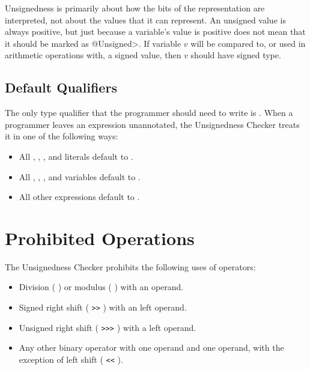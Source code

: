 Unsignedness is primarily about how the bits of the representation are
interpreted, not about the values that it can represent.  An unsigned value
is always positive, but just because a variable's value is positive does
not mean that it should be marked as \<@Unsigned>.  If variable $v$ will be
compared to, or used in arithmetic operations with, a signed value, then
$v$ should have signed type.


\subsection{Default Qualifiers\label{unsignedness-checker-annotations-default-qualifiers}}

The only type qualifier that the programmer should need to write is
. When a programmer leaves an expression unannotated, the
Unsignedness Checker treats it in one of the following ways:

\begin{itemize}

    \item
    All , , , and  literals default
    to .
    \item
    All , , , and  variables default
    to .
    \item
    All other expressions default to .

\end{itemize}

\section{Prohibited Operations\label{unsignedness-checker-Prohibited-Operations}}

The Unsignedness Checker prohibits the following uses of operators:

\begin{itemize}

    \item
    Division ( \code{/} ) or modulus ( \code{\%} ) with an 
    operand.
    \item
    Signed right shift ( \verb|>>| ) with an  left operand.
    \item
    Unsigned right shift ( \verb|>>>| ) with a  left operand.
    \item
    Any other binary operator with one  operand and one
     operand, with the exception of left shift ( \verb|<<| ).

\end{itemize}

